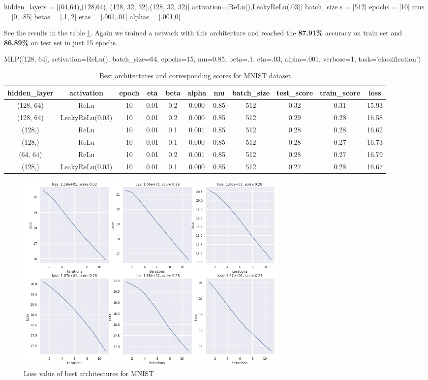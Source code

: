 \documentclass[10pt]{SelfArx} %
\begin{document}
	\begin{python}
hidden_layers = [(64,64),(128,64),
(128, 32, 32),(128, 32, 32)]
activation=[ReLu(),LeakyReLu(.03)]
batch_size	s = [512]
epochs = [10]
mus = [0, .85]
betas = [.1,.2]
etas = [.001,.01]
alphas = [.001,0]
	\end{python}
	See the results in the table \ref{tmnist}. Again we trained a network with this architecture and reached the \textbf{87.91\%} accuracy on train set and \textbf{86.89\%} on test set in just 15 epochs.
	\begin{python}
MLP([128, 64], activation=ReLu(),
batch_size=64, epochs=15, mu=0.85,
beta=.1, eta=.03, alpha=.001,
verbose=1, task='classification')
	\end{python}
	\begin{table}[]
		\begin{tabular*}{1\textwidth}{@{\extracolsep{\fill} }ccccccccccc@{}}
			\toprule
			hidden\_layer & activation & epoch & eta & beta & alpha & mu & batch\_size & test\_score & train\_score & loss \\ \midrule
			(128, 64) & ReLu & 10 & 0.01 & 0.2 & 0.000 & 0.85 & 512 & 0.32 & 0.31 & 15.93 \\
			(128, 64) & LeakyReLu(0.03) & 10 & 0.01 & 0.2 & 0.000 & 0.85 & 512 & 0.29 & 0.28 & 16.58 \\
			(128,) & ReLu & 10 & 0.01 & 0.1 & 0.001 & 0.85 & 512 & 0.28 & 0.28 & 16.62 \\
			(128,) & ReLu & 10 & 0.01 & 0.1 & 0.000 & 0.85 & 512 & 0.28 & 0.27 & 16.73 \\
			(64, 64) & ReLu & 10 & 0.01 & 0.2 & 0.001 & 0.85 & 512 & 0.28 & 0.27 & 16.79 \\
			(128,) & LeakyReLu(0.03) & 10 & 0.01 & 0.1 & 0.000 & 0.85 & 512 & 0.27 & 0.28 & 16.67 \\ \bottomrule
		\end{tabular*}
		\caption{Best architectures and corresponding scores for MNIST dataset}
		\label{tmnist}
	\end{table}
	\begin{figure}\centering
		\includegraphics[width=1.79\columnwidth, height=10cm]{img/mnist-plots1}
		\caption{Loss value of best architectures for MNIST}
		\label{fmnist}
	\end{figure}
\end{document}
